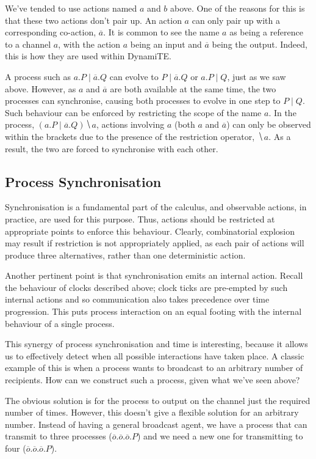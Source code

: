 \documentclass{acm_proc_article-sp}
\begin{document}
We've tended to use actions named $a$ and $b$ above.  One of the reasons
for this is that these two actions don't pair up.  An action $a$ can
only pair up with a corresponding co-action, $\overline{a}$.  It is
common to see the name $a$ as being a reference to a channel $a$, with
the action $a$ being an input and $\overline{a}$ being the output.
Indeed, this is how they are used within DynamiTE.

A process such as $a.P \mid \overline{a}.Q$ can evolve to $P \mid
\overline{a}.Q$ or $a.P \mid Q$, just as we saw above.  However, as $a$
and $\overline{a}$ are both available at the same time, the two
processes can synchronise, causing both processes to evolve in one
step to $P \mid Q$.  Such behaviour can be enforced by restricting the
scope of the name $a$.  In the process, $(a.P \mid \overline{a}.Q)
\hide{a}$, actions involving $a$ (both $a$ and $\overline{a}$) can only
be observed within the brackets due to the presence of the restriction
operator, $\hide{a}$.  As a result, the two are forced to synchronise
with each other.

\subsection{Process Synchronisation}
\label{sync}

Synchronisation is a fundamental part of the calculus, and observable
actions, in practice, are used for this purpose.  Thus, actions should
be restricted at appropriate points to enforce this behaviour.  Clearly,
combinatorial explosion may result if restriction is not appropriately
applied, as each pair of actions will produce three alternatives, rather
than one deterministic action.  

Another pertinent point is that synchronisation emits an internal
action.  Recall the behaviour of clocks described above; clock ticks are
pre-empted by such internal actions and so communication also takes
precedence over time progression.  This puts process interaction on an
equal footing with the internal behaviour of a single process.

This synergy of process synchronisation and time is interesting, because
it allows us to effectively detect when all possible interactions have
taken place.  A classic example of this is when a process wants to
broadcast to an arbitrary number of recipients.  How can we construct
such a process, given what we've seen above?

The obvious solution is for the process to output on the channel just
the required number of times.  However, this doesn't give a flexible
solution for an arbitrary number.  Instead of having a general broadcast
agent, we have a process that can transmit to three processes
($\overline{o}.\overline{o}.\overline{o}.P$) and we need a new one for
transmitting to four ($\overline{o}.\overline{o}.\overline{o}.P$).
\end{document}
